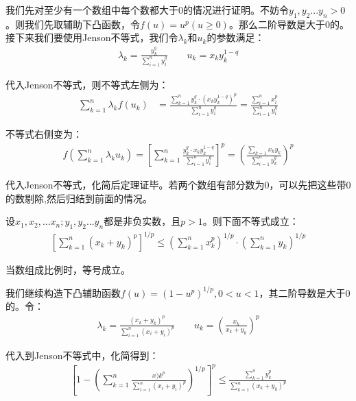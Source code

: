 \documentclass{ctexart}
\begin{document}
我们先对至少有一个数组中每个数都大于0的情况进行证明。不妨令$y_1,y_2...y_n>0$。则我们先取辅助下凸函数，令$f(u)=u^p (u\geq 0)$。那么二阶导数是大于0的。接下来我们要使用Jenson不等式，我们令$\lambda_k$和$u_k$的参数满足：
\begin{align*}
    \lambda_k=\frac{y_k^q}{\sum_{i=1}^n y_i^q}\qquad u_k=x_ky_k^{1-q}
\end{align*}

代入Jenson不等式，则不等式左侧为：
\begin{align*}
\sum_{k=1}^n\lambda_kf(u_k)&=\frac{\sum_{k=1}^ny_k^q\cdot(x_ky_k^{1-q})^p}{\sum_{i=1}^n y_i^q}=\frac{\sum_{i=1}^n x_i^p}{\sum_{i=1}^n y_i^q}
\end{align*}

不等式右侧变为：
\begin{align*}
   f(\sum_{k=1}^n\lambda_ku_k)=\left[\sum_{k=1}^n\frac{y_k^q\cdot x_ky_k^{1-q}}{\sum_{i=1}^n y_i^q}\right]^p
=\left(\frac{\sum_{k=1}x_ky_k}{\sum_{i=1}^ny_k^q} \right)^p
\end{align*}

代入Jenson不等式，化简后定理证毕。若两个数组有部分数为0，可以先把这些带0的数剔除,然后归结到前面的情况。

\begin{tcolorbox}[
    colback=bac1,     %
    colframe=fra1,   %
    coltitle=white,             %
    coltext=tex1,
    title=Minkowski不等式,
    fonttitle=\bfseries,        %
arc=3mm,                     %
breakable
]
设$x_1,x_2,...x_n;y_1,y_2...y_n$都是非负实数，且$p>1$。则下面不等式成立：
\begin{align*}
    \left[\sum_{k=1}^n (x_k+y_k)^p\right]^{1/p}\leq (\sum_{k=1}^n x_k^p)^{1/p}\cdot (\sum_{k=1}^n y_k)^{1/p}
\end{align*}

当数组成比例时，等号成立。
\end{tcolorbox}

我们继续构造下凸辅助函数$f(u)=(1-u^p)^{1/p},0<u<1$，其二阶导数是大于0的。令：
\begin{align*}
    \lambda_k=\frac{(x_k+y_k)^p}{\sum_{i=1}^n(x_i+y_i)^p}\qquad u_k=(\frac{x_k}{x_k+y_k})^p
\end{align*}

代入到Jenson不等式中，化简得到：
\begin{align*}
    \left[1-(\sum_{k=1}^n\frac{x)k^p}{\sum_{i=1}^n(x_i+y_i)^p})^{1/p}\right]^p\leq \frac{\sum_{k=1}^n y_k^p}{\sum_{k=1}^n(x_k+y_k)^p}
\end{align*}
\end{document}
